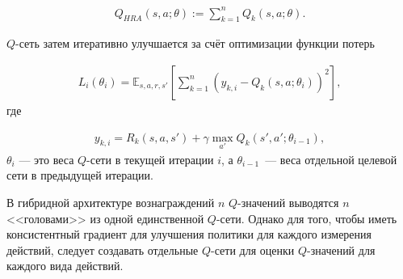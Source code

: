 \begin{equation}
    \begin{multlined}
        Q_{H R A}(s, a; \theta) := \sum^n_{k=1} Q_k(s, a;\theta).
    \end{multlined}
\end{equation}

$Q$-сеть затем итеративно улучшается за счёт оптимизации функции потерь

\begin{equation}
    \begin{multlined}
        L_i(\theta_i) = \mathbb{E}_{s, a, r, s'}[\sum^n_{k=1}(y_{k, i}-Q_k(s, a;\theta_i))^2],
    \end{multlined}
\end{equation}
где

\begin{equation}
    \begin{multlined}
        y_{k, i} = R_k(s, a, s') + \gamma \max_{a'} Q_k(s', a';\theta_{i-1}),
    \end{multlined}
\end{equation}
$\theta_i$ — это веса $Q$-сети в текущей итерации $i$, а $\theta_{i-1}$~--- веса отдельной целевой сети в предыдущей итерации.

В гибридной архитектуре вознаграждений $n$ $Q$-значений выводятся $n$ <<головами>> из одной единственной $Q$-сети. Однако для того, чтобы иметь консистентный градиент для улучшения политики для каждого измерения действий, следует создавать отдельные $Q$-сети для оценки $Q$-значений для каждого вида действий.
